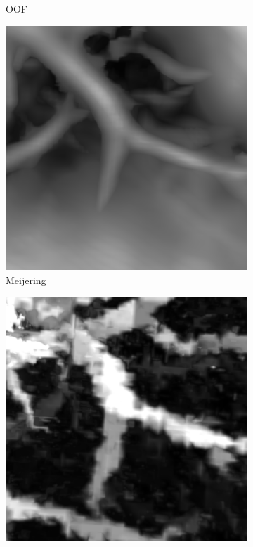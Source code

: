 \begin{figure}[!ht]
\begin{subfigure}[t]{0.30\textwidth}
        \caption{OOF}
      \end{subfigure}
      \begin{subfigure}[t]{0.30\textwidth}
        \includegraphics[clip = true, trim  = 0 50 0 80, width=\textwidth]{Images/Ircad_k_Meijering.png}
        \caption{Meijering}
      \end{subfigure}
      \begin{subfigure}[t]{0.30\textwidth}
        \includegraphics[clip = true, trim  = 0 50 0 80, width=\textwidth]{Images/Ircad_k_RORPO.png}

\end{subfigure}
\end{figure}
